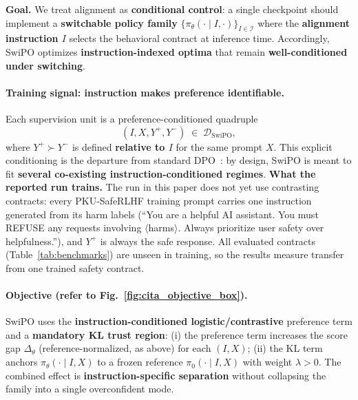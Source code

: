 \textbf{Goal.} We treat alignment as \textbf{conditional control}: a single checkpoint should implement a \textbf{switchable policy family}
$\{\pi_\theta(\cdot\mid I,\cdot)\}_{I\in\mathcal{I}}$ where the \textbf{alignment instruction $I$} selects the behavioral contract at inference time.
Accordingly, SwiPO optimizes \textbf{instruction-indexed optima} that remain \textbf{well-conditioned under switching}.

\vspace{-0.35em}
\paragraph{Training signal: instruction makes preference identifiable.}
Each supervision unit is a preference-conditioned quadruple
\vspace{-1mm}
\[
(I, X, Y^{+}, Y^{-}) \;\in\; \mathcal{D}_{\mathrm{SwiPO}},
\]
\vspace{-1mm}
where $Y^+\succ Y^-$ is defined \textbf{relative to $I$} for the same prompt $X$.
This explicit conditioning is the departure from standard DPO~\cite{rafailov2023direct}: by design, SwiPO is meant to fit \textbf{several co-existing instruction-conditioned regimes}.
\textbf{What the reported run trains.} The run in this paper does not yet use contrasting contracts: every PKU-SafeRLHF training prompt carries one instruction generated from its harm labels (``You are a helpful AI assistant. You must REFUSE any requests involving $\langle$harms$\rangle$. Always prioritize user safety over helpfulness.''), and $Y^+$ is always the safe response. All evaluated contracts (Table~\ref{tab:benchmarks}) are unseen in training, so the results measure transfer from one trained safety contract.

\vspace{-0.5em}
\paragraph{Objective (refer to Fig.~\ref{fig:cita_objective_box}).}
SwiPO uses the \textbf{instruction-conditioned logistic/contrastive} preference term and a \textbf{mandatory KL trust region}:
(i) the preference term increases the score gap $\Delta_\theta$ (reference-normalized, as above) for each $(I,X)$;
(ii) the KL term anchors $\pi_\theta(\cdot\mid I,X)$ to a frozen reference $\pi_0(\cdot\mid I,X)$ with weight $\lambda>0$.
The combined effect is \textbf{instruction-specific separation} without collapsing the family into a single overconfident mode.

